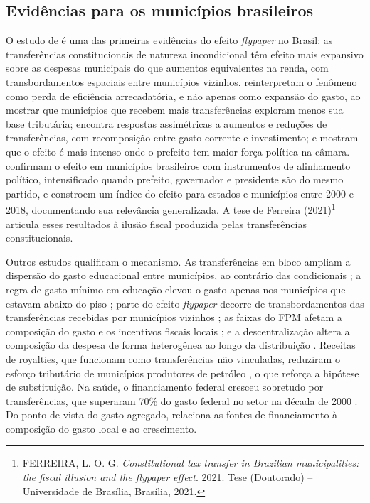 \subsection{Evidências para os municípios brasileiros}

O estudo de  é uma das primeiras evidências do efeito \textit{flypaper} no Brasil: as transferências constitucionais de natureza incondicional têm efeito mais expansivo sobre as despesas municipais do que aumentos equivalentes na renda, com transbordamentos espaciais entre municípios vizinhos.  reinterpretam o fenômeno como perda de eficiência arrecadatória, e não apenas como expansão do gasto, ao mostrar que municípios que recebem mais transferências exploram menos sua base tributária;  encontra respostas assimétricas a aumentos e reduções de transferências, com recomposição entre gasto corrente e investimento; e  mostram que o efeito é mais intenso onde o prefeito tem maior força política na câmara.  confirmam o efeito em municípios brasileiros com instrumentos de alinhamento político, intensificado quando prefeito, governador e presidente são do mesmo partido, e  constroem um índice do efeito para estados e municípios entre 2000 e 2018, documentando sua relevância generalizada. A tese de Ferreira (2021)\footnote{FERREIRA, L. O. G. \textit{Constitutional tax transfer in Brazilian municipalities: the fiscal illusion and the flypaper effect}. 2021. Tese (Doutorado) -- Universidade de Brasília, Brasília, 2021.} articula esses resultados à ilusão fiscal produzida pelas transferências constitucionais.

Outros estudos qualificam o mecanismo. As transferências em bloco ampliam a dispersão do gasto educacional entre municípios, ao contrário das condicionais \cite{mattos2018}; a regra de gasto mínimo em educação elevou o gasto apenas nos municípios que estavam abaixo do piso \cite{cruz2020}; parte do efeito \textit{flypaper} decorre de transbordamentos das transferências recebidas por municípios vizinhos \cite{castro2021}; as faixas do FPM afetam a composição do gasto e os incentivos fiscais locais \cite{alves2024}; e a descentralização altera a composição da despesa de forma heterogênea ao longo da distribuição \cite{sousa2021}. Receitas de royalties, que funcionam como transferências não vinculadas, reduziram o esforço tributário de municípios produtores de petróleo \cite{postali2015}, o que reforça a hipótese de substituição. Na saúde, o financiamento federal cresceu sobretudo por transferências, que superaram 70\% do gasto federal no setor na década de 2000 \cite{machado2014}. Do ponto de vista do gasto agregado,  relaciona as fontes de financiamento à composição do gasto local e ao crescimento.

